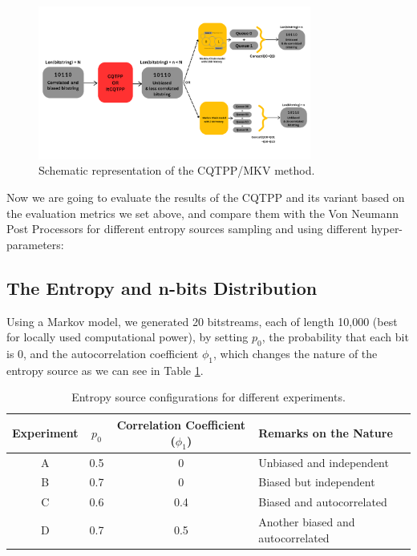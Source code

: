\begin{figure}[h!]
    \centering
    \includegraphics[width=0.8\textwidth]{figures/cqtppmkv.png}
    \caption{Schematic representation of the CQTPP/MKV method.}
    \label{fig:cqtppmkv}
\end{figure}



Now we are going to evaluate the results of the CQTPP and its variant based on the evaluation metrics we set above, and compare them with the Von Neumann Post Processors for different entropy sources sampling and using different hyper-parameters:

\subsection{The Entropy and n-bits Distribution}
Using a Markov model, we generated 20 bitstreams, each of length 10,000 (best for locally used computational power), by setting \( p_0 \), the probability that each bit is 0, and the autocorrelation coefficient \( \phi_1 \), which changes the nature of the entropy source as we can see in Table \ref{tab:experiments}.

\begin{table}[h!]
    \centering
    \begin{tabular}{|c|c|c|l|}
        \hline
        \textbf{Experiment} & \textbf{\( p_0 \)} & \textbf{Correlation Coefficient (\( \phi_1 \))} & \textbf{Remarks on the Nature} \\
        \hline
        A & 0.5 & 0 & Unbiased and independent \\
        B & 0.7 & 0 & Biased but independent \\
        C & 0.6 & 0.4 & Biased and autocorrelated \\
        D & 0.7 & 0.5 & Another biased and autocorrelated  \\
        \hline
    \end{tabular}
    \caption{Entropy source configurations for different experiments.}
    \label{tab:experiments}
\end{table}

